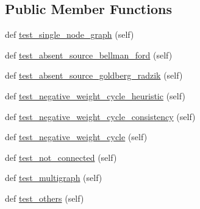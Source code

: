 \subsection*{Public Member Functions}
\begin{DoxyCompactItemize}
\item 
def \hyperlink{classnetworkx_1_1algorithms_1_1shortest__paths_1_1tests_1_1test__weighted_1_1TestBellmanFordAndGoldbergRadzik_aec7d78701180ec14a188d658891ee61d}{test\+\_\+single\+\_\+node\+\_\+graph} (self)
\item 
def \hyperlink{classnetworkx_1_1algorithms_1_1shortest__paths_1_1tests_1_1test__weighted_1_1TestBellmanFordAndGoldbergRadzik_a71a6e86fc05e351f1826f8dacfda2a03}{test\+\_\+absent\+\_\+source\+\_\+bellman\+\_\+ford} (self)
\item 
def \hyperlink{classnetworkx_1_1algorithms_1_1shortest__paths_1_1tests_1_1test__weighted_1_1TestBellmanFordAndGoldbergRadzik_a0226643d72f0aef53553538984a971d6}{test\+\_\+absent\+\_\+source\+\_\+goldberg\+\_\+radzik} (self)
\item 
def \hyperlink{classnetworkx_1_1algorithms_1_1shortest__paths_1_1tests_1_1test__weighted_1_1TestBellmanFordAndGoldbergRadzik_adc0b4e49722f3a9a504f8c879b443bfe}{test\+\_\+negative\+\_\+weight\+\_\+cycle\+\_\+heuristic} (self)
\item 
def \hyperlink{classnetworkx_1_1algorithms_1_1shortest__paths_1_1tests_1_1test__weighted_1_1TestBellmanFordAndGoldbergRadzik_a9dd384eab83fcbc6012ade07f4212c19}{test\+\_\+negative\+\_\+weight\+\_\+cycle\+\_\+consistency} (self)
\item 
def \hyperlink{classnetworkx_1_1algorithms_1_1shortest__paths_1_1tests_1_1test__weighted_1_1TestBellmanFordAndGoldbergRadzik_a2eb7337ef1c3184a8420e388e1935cf9}{test\+\_\+negative\+\_\+weight\+\_\+cycle} (self)
\item 
def \hyperlink{classnetworkx_1_1algorithms_1_1shortest__paths_1_1tests_1_1test__weighted_1_1TestBellmanFordAndGoldbergRadzik_aeef99842415c34125688ddd97722e482}{test\+\_\+not\+\_\+connected} (self)
\item 
def \hyperlink{classnetworkx_1_1algorithms_1_1shortest__paths_1_1tests_1_1test__weighted_1_1TestBellmanFordAndGoldbergRadzik_a8b9cad332f7d8fae5f288201a4016526}{test\+\_\+multigraph} (self)
\item 
def \hyperlink{classnetworkx_1_1algorithms_1_1shortest__paths_1_1tests_1_1test__weighted_1_1TestBellmanFordAndGoldbergRadzik_a7fe13461b23d98f00ccbe41272fac46a}{test\+\_\+others} (self)
\item 

\end{DoxyCompactItemize}

